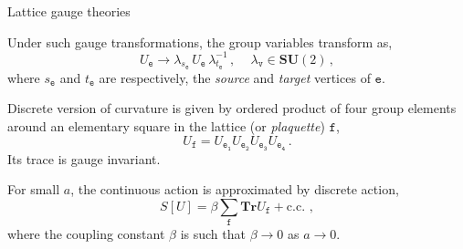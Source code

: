 \documentclass[12pt,titlepage]{article}
\begin{document}
\begin{frame}{Lattice gauge theories}
    \begin{list}{\,}{\leftmargin=1em \itemindent=0em}
        \item<1-> Under such gauge transformations, the group variables transform as,
        \begin{equation}
            U_\mathtt{e}\to\lambda_{s_\mathtt{e}}\,U_\mathtt{e}\,\lambda_{t_\mathtt{e}}^{-1}\,,\,\,\,\,\,\,\, \lambda_{\mathtt{v}}\in\mathbf{SU}(2)\,,
        \end{equation}
        where $s_\mathtt{e}$ and $t_\mathtt{e}$ are respectively, the \textit{source} and \textit{target} vertices of $\mathtt{e}$.
        \item<2-> Discrete version of curvature is given by ordered product of four group elements around an elementary square in the lattice (or \textit{plaquette}) $\mathtt{f}$,
        \begin{equation}\label{u_f}
            U_\mathtt{f}=U_\mathtt{e_1}U_\mathtt{e_2}U_\mathtt{e_3}U_\mathtt{e_4}\,.
        \end{equation}
        Its trace is gauge invariant.
        \item<3-> For small $a$, the continuous action is approximated by discrete action,
        \begin{equation}
            S[U]=\beta\sum_\mathtt{f}\mathbf{Tr}U_\mathtt{f}+\text{c.c.}\,\,,
        \end{equation}
        where the coupling constant $\beta$ is such that $\beta\to 0$ as $a\to 0$.
    \end{list}
\end{frame}
\end{document}
